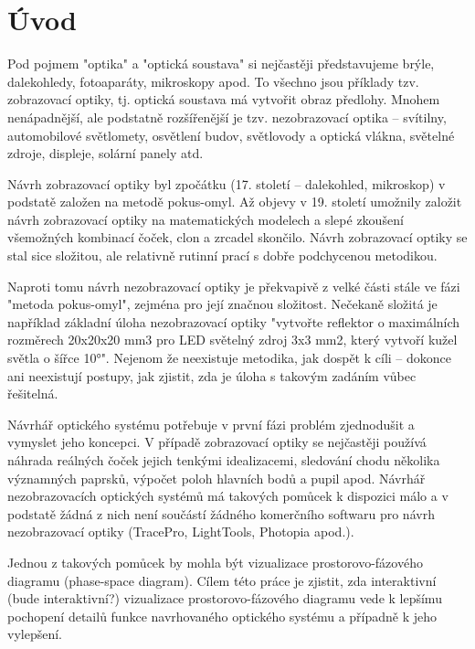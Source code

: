 \chapter{Úvod}

Pod pojmem "optika" a "optická soustava" si nejčastěji představujeme
brýle, dalekohledy, fotoaparáty, mikroskopy apod. To všechno jsou
příklady tzv. zobrazovací optiky, tj. optická soustava má vytvořit obraz
předlohy. Mnohem nenápadnější, ale podstatně rozšířenější je tzv.
nezobrazovací optika -- svítilny, automobilové světlomety, osvětlení
budov, světlovody a optická vlákna, světelné zdroje, displeje, solární
panely atd.

Návrh zobrazovací optiky byl zpočátku (17. století -- dalekohled,
mikroskop) v podstatě založen na metodě pokus-omyl. Až objevy v 19.
století umožnily založit návrh zobrazovací optiky na matematických
modelech a slepé zkoušení všemožných kombinací čoček, clon a zrcadel
skončilo. Návrh zobrazovací optiky se stal sice složitou, ale relativně
rutinní prací s dobře podchycenou metodikou.

Naproti tomu návrh nezobrazovací optiky je překvapivě z velké části
stále ve fázi "metoda pokus-omyl", zejména pro její značnou složitost.
Nečekaně složitá je například základní úloha nezobrazovací optiky
"vytvořte reflektor o maximálních rozměrech 20x20x20 mm3 pro LED
světelný zdroj 3x3 mm2, který vytvoří kužel světla o šířce 10°". Nejenom
že neexistuje metodika, jak dospět k cíli -- dokonce ani neexistují
postupy, jak zjistit, zda je úloha s takovým zadáním vůbec řešitelná.

Návrhář optického systému potřebuje v první fázi problém zjednodušit a
vymyslet jeho koncepci. V případě zobrazovací optiky se nejčastěji
používá náhrada reálných čoček jejich tenkými idealizacemi, sledování
chodu několika významných paprsků, výpočet poloh hlavních bodů a pupil
apod. Návrhář nezobrazovacích optických systémů má takových pomůcek k
dispozici málo a v podstatě žádná z nich není součástí žádného
komerčního softwaru pro návrh nezobrazovací optiky (TracePro,
LightTools, Photopia apod.).

Jednou z takových pomůcek by mohla být vizualizace prostorovo-fázového
diagramu (phase-space diagram). Cílem této práce je zjistit, zda
interaktivní (bude interaktivní?) vizualizace prostorovo-fázového
diagramu vede k lepšímu pochopení detailů funkce navrhovaného optického
systému a případně k jeho vylepšení.
